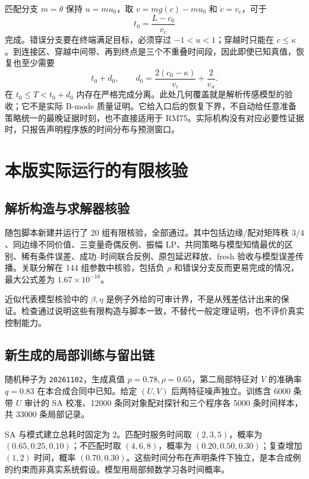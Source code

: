 \documentclass[11pt,a4paper,fontset=fandol]{ctexart}
\theoremstyle{definition}\newtheorem{definition}[theorem]{定义}
\theoremstyle{remark}\newtheorem{remark}[theorem]{说明}
\numberwithin{equation}{section}
\begin{document}
匹配分支 $m=\theta$ 保持 $u=mu_0$，取 $v=mg(c)-mu_0$ 和 $\dot c=v_c$，可于
\begin{equation}
 t_0=\frac{L-c_0}{v_c}
\end{equation}
完成。错误分支要在终端满足目标，必须穿过 $-1<u<1$；穿越时只能在 $c\le\kappa$。到连接区、穿越中间带、再到终点是三个不重叠时间段，因此即使已知真值，恢复也至少需要
\begin{equation}
 t_0+d_0,\qquad d_0=\frac{2(c_0-\kappa)}{v_c}+\frac2{v_u}.
\end{equation}
在 $t_0\le T<t_0+d_0$ 内存在严格完成分离。此处几何覆盖就是解析传感模型的验收；它不是实际 B-mode 质量证明。它给入口后的恢复下界，不自动给任意准备策略统一的最晚证据时刻，也不直接适用于 RM75。实际机构没有对应必要性证据时，只报告声明程序族的时间分布与预测窗口。

\section{本版实际运行的有限核验}
\label{app:verification}
\subsection{解析构造与求解器核验}
随包脚本新建并运行了 20 组有限核验，全部通过。其中包括边缘/配对矩阵秩 $3/4$、同边缘不同价值、三变量奇偶反例、振幅 LP、共同策略与模型知情最优的区别、稀有条件误差、成功--时间联合反例、原包延迟释放、fresh 验收与模型误差传播。关联分解在 144 组参数中核验，包括负 $\rho$ 和错误分支反而更易完成的情况，最大公式差为 $1.67\times10^{-16}$。

近似代表模型核验中的 $\beta,\eta$ 是例子外给的可审计界，不是从残差估计出来的保证。检查通过说明这些有限构造与脚本一致，不替代一般定理证明，也不评价真实控制能力。

\subsection{新生成的局部训练与留出链}
随机种子为 \texttt{20261102}，生成真值 $p=0.78,\rho=0.65$，第二局部特征对 $V$ 的准确率 $q=0.83$ 在本合成合同中已知。给定 $(U,V)$ 后两特征噪声独立。训练含 6000 条带 $U$ 审计的 SA 校准、12000 条同对象配对探针和三个程序各 5000 条时间样本，共 33000 条局部记录。

SA 与模式建立总耗时固定为 $2$。匹配时服务时间取 $(2,3,5)$，概率为 $(0.65,0.25,0.10)$；不匹配时取 $(4,6,8)$，概率为 $(0.20,0.50,0.30)$；复查增加 $(1,2)$ 时间，概率 $(0.70,0.30)$。这些时间分布在声明条件下独立，是本合成例的约束而非真实系统假设。模型用局部频数学习各时间概率。
\end{document}
